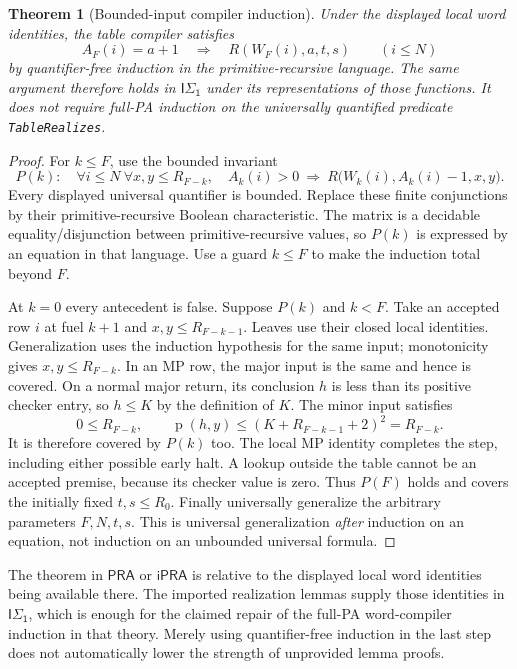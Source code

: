 \documentclass[11pt]{article}
\newtheorem{theorem}{Theorem}
\newcommand{\ipra}{\mathsf{iPRA}}
\newcommand{\pra}{\mathsf{PRA}}
\newcommand{\isone}{\mathsf{I\Sigma_1}}
\newcommand{\p}{\operatorname{p}}
\begin{document}
\begin{theorem}[Bounded-input compiler induction]\label{thm:bounded}
Under the displayed local word identities, the table compiler satisfies
\[
 A_F(i)=a+1\quad\Longrightarrow\quad R(W_F(i),a,t,s)
 \qquad(i\le N)
\]
by quantifier-free induction in the primitive-recursive language. The same
argument therefore holds in $\isone$ under its representations of those
functions. It does not require full-PA induction on the universally quantified
predicate \texttt{TableRealizes}.
\end{theorem}
\begin{proof}
For $k\le F$, use the bounded invariant
\[
 P(k):\quad
 \forall i\le N\ \forall x,y\le R_{F-k},\quad
 A_k(i)>0\ \Longrightarrow\
 R\bigl(W_k(i),A_k(i)-1,x,y\bigr).
\]
Every displayed universal quantifier is bounded. Replace these finite
conjunctions by their primitive-recursive Boolean characteristic. The
matrix is a decidable equality/disjunction between primitive-recursive
values, so $P(k)$ is expressed by an equation in that language. Use a
guard $k\le F$ to make the induction total beyond $F$.

At $k=0$ every antecedent is false. Suppose $P(k)$ and $k<F$.
Take an accepted row $i$ at fuel $k+1$ and $x,y\le R_{F-k-1}$.
Leaves use their closed local identities. Generalization uses the induction
hypothesis for the same input; monotonicity gives
$x,y\le R_{F-k}$. In an MP row, the major input is the same and hence is
covered. On a normal major return, its conclusion $h$ is less than its
positive checker entry, so $h\le K$ by the definition of $K$.
The minor input satisfies
\[
 0\le R_{F-k},\qquad
 \p(h,y)\le(K+R_{F-k-1}+2)^2=R_{F-k}.
\]
It is therefore covered by $P(k)$ too. The local MP identity completes
the step, including either possible early halt. A lookup outside the table
cannot be an accepted premise, because its checker value is zero.
Thus $P(F)$ holds and covers the initially fixed $t,s\le R_0$.
Finally universally generalize the arbitrary parameters $F,N,t,s$.
This is universal generalization \emph{after} induction on an equation,
not induction on an unbounded universal formula.
\end{proof}

The theorem in $\pra$ or $\ipra$ is relative to the displayed local word
identities being available there. The imported realization lemmas supply
those identities in $\isone$, which is enough for the claimed repair of
the full-PA word-compiler induction in that theory. Merely using
quantifier-free induction in the last step does not automatically lower
the strength of unprovided lemma proofs.
\end{document}
